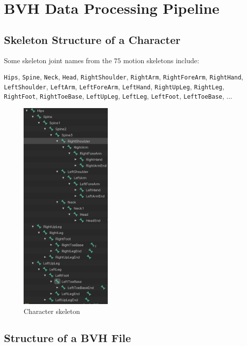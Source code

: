 \appendix
\section{BVH Data Processing Pipeline}
\label{appendix:BVHData}

\subsection{Skeleton Structure of a Character}
\label{appendix:BVHSkeleton}

Some skeleton joint names from the $75$ motion skeletons include:

{
	\small
	\texttt{Hips},
	\texttt{Spine},
	\texttt{Neck},
	\texttt{Head},
	\texttt{RightShoulder},
	\texttt{RightArm},
	\texttt{RightForeArm},
	\texttt{RightHand},
	\texttt{LeftShoulder},
	\texttt{LeftArm},
	\texttt{LeftForeArm},
	\texttt{LeftHand},
	\texttt{RightUpLeg},
	\texttt{RightLeg},
	\texttt{RightFoot},
	\texttt{RightToeBase},
	\texttt{LeftUpLeg},
	\texttt{LeftLeg},
	\texttt{LeftFoot},
	\texttt{LeftToeBase},
	...
}

\begin{figure}[h]
	\centering
	\includegraphics[height=10.5cm]{images/Bone}
	\caption{Character skeleton}
	\label{fig:Bone}
\end{figure}

\subsection{Structure of a BVH File}
\label{appendix:BVHStructure}

